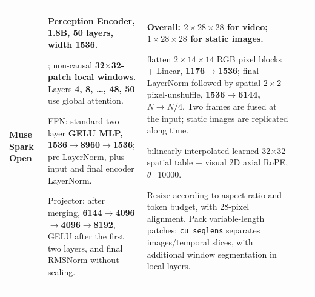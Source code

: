 \begin{longtable}{@{}P{0.100\dimexpr\textwidth-40pt\relax}P{0.230\dimexpr\textwidth-40pt\relax}P{0.290\dimexpr\textwidth-40pt\relax}P{0.240\dimexpr\textwidth-40pt\relax}P{0.140\dimexpr\textwidth-40pt\relax}@{}}
{\bfseries Muse Spark Open} & {\bfseries Perception Encoder, 1.\allowbreak{}8B, 50 layers, width 1536.\allowbreak{}}\par{}; non-\allowbreak{}causal {\bfseries 32\(\times\)32-\allowbreak{}patch local windows}.\allowbreak{} Layers {\bfseries 4, 8, …, 48, 50} use global attention.\allowbreak{}\par\vspace{1pt}FFN: standard two-\allowbreak{}layer {\bfseries GELU MLP, 1536\(\rightarrow\)8960\(\rightarrow\)1536}; pre-\allowbreak{}LayerNorm, plus input and final encoder LayerNorm.\allowbreak{}\par\vspace{1pt}Projector: after merging, {\bfseries 6144\(\rightarrow\)4096\(\rightarrow\)4096\(\rightarrow\)8192}, GELU after the first two layers, and final RMSNorm without scaling.\allowbreak{} & {\bfseries Overall: \(2\times 28\times 28\) for video; \(1\times 28\times 28\) for static images.\allowbreak{}}\par{} flatten \(2\times 14\times 14\) RGB pixel blocks + Linear, {\bfseries 1176\(\rightarrow\)1536}; final LayerNorm followed by spatial \(2\times 2\) pixel-\allowbreak{}unshuffle, {\bfseries 1536\(\rightarrow\)6144, \(N\rightarrow N/4\)}.\allowbreak{} Two frames are fused at the input; static images are replicated along time.\allowbreak{}\par\vspace{1pt}{\bfseries Position:} bilinearly interpolated learned 32\(\times\)32 spatial table + visual 2D axial RoPE, \(\theta\)=\allowbreak{}10000.\allowbreak{}\par{} Resize according to aspect ratio and token budget, with 28-\allowbreak{}pixel alignment.\allowbreak{} Pack variable-\allowbreak{}length patches; \texttt{cu\_\allowbreak{}seqlens} separates images/\allowbreak{}temporal slices, with additional window segmentation in local layers.\allowbreak{} & \textemdash{} & \textemdash{} \\
\addlinespace[6pt]

\end{longtable}
